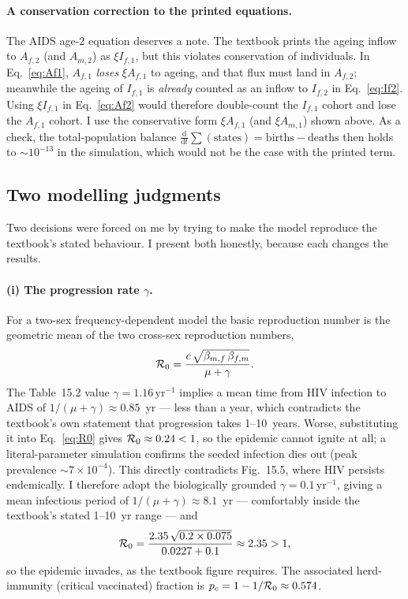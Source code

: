 \paragraph{A conservation correction to the printed equations.}
The AIDS age-2 equation deserves a note. The textbook prints the ageing inflow to
$A_{f,2}$ (and $A_{m,2}$) as $\xi I_{f,1}$, but this violates conservation of
individuals. In Eq.~\ref{eq:Af1}, $A_{f,1}$ \emph{loses} $\xi A_{f,1}$ to ageing,
and that flux must land in $A_{f,2}$; meanwhile the ageing of $I_{f,1}$ is
\emph{already} counted as an inflow to $I_{f,2}$ in Eq.~\ref{eq:If2}. Using
$\xi I_{f,1}$ in Eq.~\ref{eq:Af2} would therefore double-count the $I_{f,1}$ cohort
and lose the $A_{f,1}$ cohort. I use the conservative form $\xi A_{f,1}$
(and $\xi A_{m,1}$) shown above. As a check, the total-population balance
$\frac{\mathrm{d}}{\mathrm{d}t}\sum(\text{states}) = \text{births}-\text{deaths}$
then holds to $\sim\!10^{-13}$ in the simulation, which would not be the case with
the printed term.

\subsection{Two modelling judgments}
\label{sec:judgments}

Two decisions were forced on me by trying to make the model reproduce the
textbook's stated behaviour. I present both honestly, because each changes the
results.

\paragraph{(i) The progression rate $\gamma$.}
For a two-sex frequency-dependent model the basic reproduction number is the
geometric mean of the two cross-sex reproduction numbers,
\begin{equation}
\mathcal{R}_0 = \frac{c\,\sqrt{\beta_{m,f}\,\beta_{f,m}}}{\mu+\gamma}.
\label{eq:R0}
\end{equation}
The Table~15.2 value $\gamma=1.16\,\text{yr}^{-1}$ implies a mean time from HIV
infection to AIDS of $1/(\mu+\gamma)\approx0.85$~yr --- less than a year, which
contradicts the textbook's own statement that progression takes 1--10~years. Worse,
substituting it into Eq.~\ref{eq:R0} gives $\mathcal{R}_0\approx0.24<1$, so the epidemic
cannot ignite at all; a literal-parameter simulation confirms the seeded infection
dies out (peak prevalence $\sim\!7\times10^{-4}$). This directly contradicts
Fig.~15.5, where HIV persists endemically. I therefore adopt the biologically
grounded $\gamma=0.1\,\text{yr}^{-1}$, giving a mean infectious period of
$1/(\mu+\gamma)\approx8.1$~yr --- comfortably inside the textbook's stated 1--10~yr
range --- and
\begin{equation}
\mathcal{R}_0 = \frac{2.35\,\sqrt{0.2\times0.075}}{0.0227+0.1} \approx 2.35 > 1,
\end{equation}
so the epidemic invades, as the textbook figure requires. The associated
herd-immunity (critical vaccinated) fraction is $p_c = 1-1/\mathcal{R}_0 \approx 0.574$.

